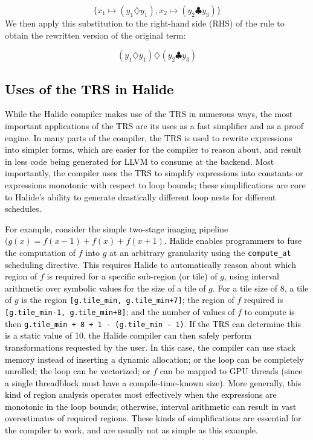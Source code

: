 \documentclass[acmsmall,review]{acmart}\settopmatter{printfolios=true,printccs=false,printacmref=false}
\newcommand{\modified}[1]{\textcolor{black}{{#1}}}
\begin{document}
\[
\{ x_1 \mapsto (y_1 \diamondsuit y_1), x_2 \mapsto (y_2 \clubsuit y_3) \}
\]
We then apply this substitution to the right-hand side (RHS) of the rule to obtain the rewritten version of the original term:

\[ 
(y_1 \diamondsuit y_1) \diamondsuit (y_2 \clubsuit y_3)
\]

\subsection{\modified{Uses of the TRS in Halide}}
\label{sec:uses-of-trs}
\modified{While the Halide compiler makes use of the TRS in numerous ways, the most important
  applications of the TRS are its uses as a fast simplifier and as a proof engine.  
  In many parts of the compiler, the TRS is used to rewrite expressions into simpler forms,
  which are easier for the compiler to reason about, and result in less code being generated for
  LLVM to consume at the backend.  Most importantly, the compiler uses the TRS to simplify expressions
  into constants or expressions monotonic with respect to loop bounds; these simplifications are core to Halide's
  ability to generate drastically different loop nests for different schedules.}

\modified{For example, consider the simple two-stage imaging pipeline $(g(x) = f(x - 1) + f(x) + f(x + 1)$.
  Halide enables programmers to fuse the computation of $f$ into $g$ at an arbitrary granularity
  using the \texttt{compute\_at} scheduling directive.  This requires Halide to automatically reason
  about which region of $f$ is required for a specific sub-region (or tile) of $g$, using interval
  arithmetic over symbolic values for the size of a tile of $g$.  For a tile size of 8, a tile of $g$
  is the region \texttt{[g.tile\_min, g.tile\_min+7]};  the region of $f$ required is
  \texttt{[g.tile\_min-1, g.tile\_min+8]}; and the number of values of $f$ to compute is then
  \texttt{g.tile\_min + 8 + 1 - (g.tile\_min - 1)}.  If the TRS can determine this is a static value
  of 10, the Halide compiler can then safely perform transformations requested by the user.  In this
  case, the compiler can use stack memory instead of inserting a dynamic allocation; or the loop can be
  completely unrolled; the loop can be vectorized; or $f$ can be mapped to GPU threads (since a single
  threadblock must have a compile-time-known size).  More generally, this kind of region analysis
  operates most effectively when the expressions are monotonic in the loop bounds; otherwise, interval
  arithmetic can result in vast overestimates of required regions.  These kinds of simplifications are essential
  for the compiler to work, and are usually not as simple as this example.}
\end{document}

